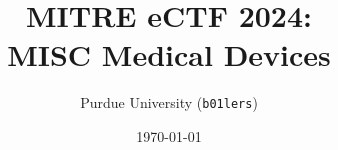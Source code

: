 \documentclass{article}
\title{MITRE eCTF 2024:\\MISC Medical Devices}
\author{Purdue University (\texttt{b01lers})}
\date{\today}
\newif\iflong
\newcommand{\jw}[1]{\iflong\textcolor{purple}{#1 --JW}\fi}
\begin{document}
\maketitle

\jw{This is a comment. Ctrl+F \texttt{main.tex} to find how do fefine one yourself. Replace color and signature if you want one too.}

\jw{For each section, use a new file to make merge conflicts / collab less annoying. e.g. see \texttt{intro.tex} for introduction}









\newpage


\end{document}
